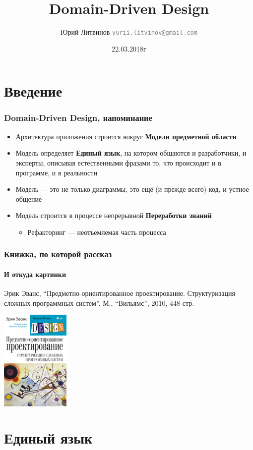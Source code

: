 \documentclass[xetex,mathserif,serif]{beamer}
\title{Domain-Driven Design}
\author[Юрий Литвинов]{Юрий Литвинов \newline \textcolor{gray}{\small\texttt{yurii.litvinov@gmail.com}}}
\date{22.03.2018г}
\begin{document}
	
	\frame{\titlepage}

	\section{Введение}

	\begin{frame}
		\frametitle{Domain-Driven Design, напоминание}
		\begin{itemize}
			\item Архитектура приложения строится вокруг \textbf{Модели предметной области}
			\item Модель определяет \textbf{Единый язык}, на котором общаются и разработчики, и эксперты, описывая естественными фразами то, что происходит и в программе, и в реальности
			\item Модель --- это не только диаграммы, это ещё (и прежде всего) код, и устное общение
			\item Модель строится в процессе непрерывной \textbf{Переработки знаний}
			\begin{itemize}
				\item Рефакторинг --- неотъемлемая часть процесса
			\end{itemize}
		\end{itemize}
	\end{frame}

	\begin{frame}
		\frametitle{Книжка, по которой рассказ}
		\framesubtitle{И откуда картинки}
		Эрик Эванс, ``Предметно-ориентированное проектирование. Структуризация сложных программных систем''. М., ``Вильямс'', 2010, 448 стр.
		\begin{center}
			\includegraphics[width=0.25\textwidth]{dddCover.jpg}
		\end{center}
	\end{frame}

	\section{Единый язык}
\end{document}
